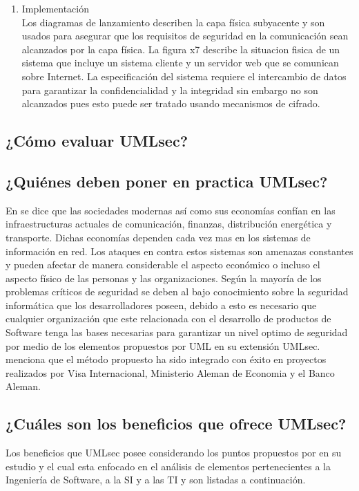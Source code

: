 \documentclass[runningheads,a4paper]{llncs}
\begin{document}
\begin{enumerate}
\begin{enumerate}
		\end{enumerate}

	\item Implementación \\

Los diagramas de lanzamiento describen la capa física subyacente y son usados para asegurar que los requisitos de seguridad en la comunicación sean alcanzados por la capa física. La figura x7 describe la situacion fisica de un sistema que incluye un sistema cliente y un servidor web que se comunican sobre Internet. La especificación del sistema requiere el intercambio de datos para garantizar la confidencialidad y la integridad sin embargo no son alcanzados pues esto puede ser tratado usando mecanismos de cifrado.
\end{enumerate}


\subsection{¿Cómo evaluar \gls{UMLsec}?}


\subsection{¿Quiénes deben poner en practica \gls{UMLsec}?}
En \cite{UMLsecExtending} se dice que las sociedades modernas así como sus economías confían en las infraestructuras actuales de comunicación, finanzas, distribución energética y transporte. Dichas economías dependen cada vez mas en los sistemas de información en red. Los ataques en contra estos sistemas son amenazas constantes y pueden afectar de manera considerable el aspecto económico o incluso el aspecto físico de las personas y las organizaciones. Según \cite{UMLsecExtending} la mayoría de los problemas críticos de seguridad se deben al bajo conocimiento sobre la seguridad informática que los desarrolladores poseen, debido a esto es necesario que cualquier organización que este relacionada con el desarrollo de productos de \gls{Software} tenga las bases necesarias para garantizar un nivel optimo de seguridad por medio de los elementos propuestos por \gls{UML} en su extensión \gls{UMLsec}.\\

\cite{UMLsecExtending} menciona que el método propuesto ha sido integrado con éxito en proyectos realizados por \gls{Visa Internacional}, \gls{Ministerio Aleman de Economia} y el \gls{Banco Aleman}.

\subsection{¿Cuáles son los beneficios que ofrece \gls{UMLsec}?}
Los beneficios que \gls{UMLsec} posee considerando los puntos propuestos por \cite{BenchmarkingSDLCLAPS} en su estudio y el cual esta enfocado en el análisis de elementos pertenecientes a la Ingeniería de \gls{Software}, a la \gls{SI} y a las \gls{TI} y son listadas a continuación.
\end{document}
